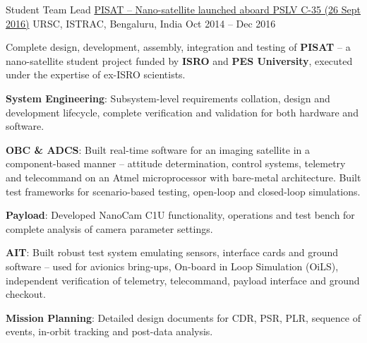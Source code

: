
\begin{cventries}
	\cventry
	{Student Team Lead}
	{\href{http://pisat.pes.edu/}{PISAT -- Nano-satellite launched aboard PSLV C-35 (26 Sept 2016)}}
	{URSC, ISTRAC, Bengaluru, India}
	{Oct 2014 -- Dec 2016}
	{
		\begin{cvitems}
		\item{Complete design, development, assembly, integration and testing of \textbf{PISAT} -- a nano-satellite student project funded by \textbf{ISRO} and \textbf{PES University}, executed under the expertise of ex-ISRO scientists.}
		\vspace{3pt}
		\item{\textbf{System Engineering}: Subsystem-level requirements collation, design and development lifecycle, complete verification and validation for both hardware and software.}
		\vspace{3pt}
		\item{\textbf{OBC \& ADCS}: Built real-time software for an imaging satellite in a component-based manner -- attitude determination, control systems, telemetry and telecommand on an Atmel microprocessor with bare-metal architecture. Built test frameworks for scenario-based testing, open-loop and closed-loop simulations.}
		\vspace{3pt}
		\item{\textbf{Payload}: Developed NanoCam C1U functionality, operations and test bench for complete analysis of camera parameter settings.}
		\vspace{3pt}
		\item{\textbf{AIT}: Built robust test system emulating sensors, interface cards and ground software -- used for avionics bring-ups, On-board in Loop Simulation (OiLS), independent verification of telemetry, telecommand, payload interface and ground checkout.}
		\vspace{3pt}
		\item{\textbf{Mission Planning}: Detailed design documents for CDR, PSR, PLR, sequence of events, in-orbit tracking and post-data analysis.}
		\end{cvitems}
	}
\end{cventries}
